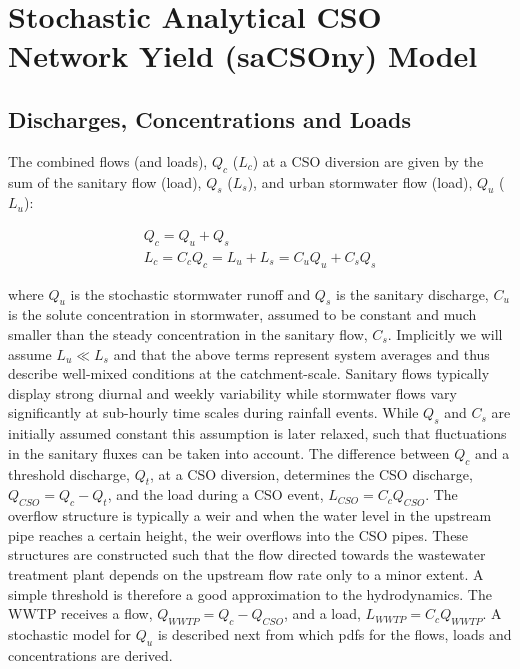 \documentclass{agujournal2018}
\begin{document}
\section{Stochastic Analytical CSO Network Yield (saCSOny) Model}
\subsection{Discharges, Concentrations and Loads}
The combined f\/lows (and loads), $Q_c$ ($L_c$) at a CSO diversion are given by the sum of the sanitary f\/low (load), $Q_s$ ($L_s$), and urban stormwater f\/low (load), $Q_u$ ($L_u$):
\begin{linenomath*}
 \begin{eqnarray}
Q_c = Q_u + Q_s\\
\label{eq:two}
L_c =  C_c Q_c = L_u + L_s = C_u Q_u + C_s Q_s
\label{eq:three}
\end{eqnarray}
\end{linenomath*}
where $Q_u$ is the stochastic stormwater runoff and $Q_s$ is the sanitary discharge, $C_u$ is the solute concentration in stormwater, assumed to be constant and much smaller than the steady concentration in the sanitary flow, $C_s$.  Implicitly we will assume $L_u \ll L_s$ and that the above terms represent system averages and thus describe well-mixed conditions at the catchment-scale. Sanitary f\/lows typically display strong diurnal and weekly variability while stormwater f\/lows vary signif\/icantly at sub-hourly time scales during rainfall events. While $Q_s$ and $C_s$ are initially assumed constant this assumption is later relaxed, such that f\/luctuations in the sanitary f\/luxes can be taken into account. The dif\/ference between $Q_c$ and a threshold discharge, $Q_t$, at a CSO diversion, determines the CSO discharge, $Q_{CSO} = Q_c - Q_t$, and the load during a CSO event, $L_{CSO} = C_c Q_{CSO}$. The overflow structure is typically a weir and when the water level in the upstream pipe reaches a certain height, the weir overflows into the CSO pipes. These structures are constructed such that the flow directed towards the wastewater treatment plant depends on the upstream flow rate only to a minor extent. A simple threshold is therefore a good approximation to the hydrodynamics. The WWTP receives a f\/low, $Q_{WWTP} = Q_c - Q_{CSO}$, and a load, $L_{WWTP} = C_c Q_{WWTP}$. A stochastic model for $Q_u$ is described next from which pdfs for the f\/lows, loads and concentrations are derived. 

  
\end{document}
